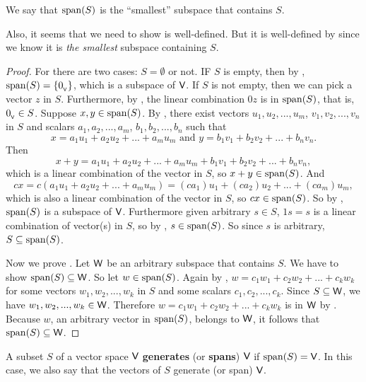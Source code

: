 \begin{note}
We say that \(\operatorname{span}(S)\) is the ``smallest'' subspace that contains \(S\).

Also, it seems that we need to show  is well-defined.
But it is well-defined by  since we know it is \emph{the smallest} subspace containing \(S\).
\end{note}

\begin{proof}
For  there are two cases: \(S = \emptyset\) or not.
IF \(S\) is empty, then by , \(\operatorname{span}(S) = \{ 0_{_{\textsf{V}}} \}\), which is a subspace of \(\textsf{V}\).
If \(S\) is not empty, then we can pick a vector \(z\) in \(S\).
Furthermore, by , the linear combination \(0z\) is in \(\operatorname{span}(S)\), that is, \(0_{_{\textsf{V}}} \in S\).
Suppose \(x, y \in \operatorname{span}(S)\).
By , there exist vectors \(u_1, u_2, ..., u_m\), \(v_1, v_2, ..., v_n\) in \(S\) and scalars \(a_1, a_2, ..., a_m\), \(b_1, b_2, ..., b_n\) such that
\[
    x = a_1 u_1 + a_2 u_2 + ... + a_m u_m \text{ and } y = b_1 v_1 + b_2 v_2 + ... + b_n v_n.
\]
Then
\[
    x + y = a_1 u_1 + a_2 u_2 + ... + a_m u_m + b_1 v_1 + b_2 v_2 + ... + b_n v_n,
\]
which is a linear combination of the vector in \(S\), so \(x + y \in \operatorname{span}(S)\).
And
\[
    cx = c(a_1 u_1 + a_2 u_2 + ... + a_m u_m) = (c a_1) u_1 + (c a_2) u_2 + ... + (c a_m) u_m,
\]
which is also a linear combination of the vector in \(S\), so \(cx \in \operatorname{span}(S)\).
So by , \(\operatorname{span}(S)\) is a subspace of \(\textsf{V}\).
Furthermore given arbitrary \(s \in S\), \(1s = s\) is a linear combination of vector(s) in \(S\), so by , \(s \in \operatorname{span}(S)\).
So since \(s\) is arbitrary, \(S \subseteq \operatorname{span}(S)\).

Now we prove .
Let \(\textsf{W}\) be an arbitrary subspace that contains \(S\).
We have to show \(\operatorname{span}(S) \subseteq \textsf{W}\).
So let \(w \in \operatorname{span}(S)\).
Again by , \(w = c_1 w_1 + c_2 w_2 + ... + c_k w_k\) for some vectors \(w_1, w_2, ..., w_k\) in \(S\) and some scalars \(c_1, c_2, ..., c_k\).
Since \(S \subseteq \textsf{W}\), we have \(w_1, w_2, ..., w_k \in \textsf{W}\).
Therefore \(w = c_1 w_1 + c_2 w_2 + ... + c_k w_k\) is in \(\textsf{W}\) by .
Because \(w\), an arbitrary vector in \(\operatorname{span}(S)\), belongs to \(\textsf{W}\), it follows that \(\operatorname{span}(S) \subseteq \textsf{W}\).
\end{proof}

\begin{definition} \label{def 1.5}
A subset \(S\) of a vector space \(\textsf{V}\) \textbf{generates} (or \textbf{spans}) \(\textsf{V}\) if \(\operatorname{span}(S) = \textsf{V}\).
In this case, we also say that the vectors of \(S\) generate (or span) \(\textsf{V}\).
\end{definition}

